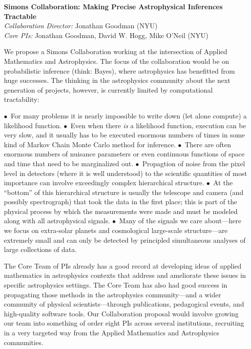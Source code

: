 \documentclass[12pt]{article}
\newcommand{\hoggitem}{$\bullet$}
\begin{document}
\sloppyy\sloppypar\thispagestyle{empty}

\noindent
\textbf{Simons Collaboration: Making Precise Astrophysical Inferences Tractable}\\
\textit{Collaboration Director:} Jonathan Goodman (NYU)\\
\textit{Core PIs:} Jonathan Goodman, David W. Hogg, Mike O'Neil (NYU)
\bigskip

We propose a Simons Collaboration working at the intersection of
Applied Mathematics and Astrophysics.
The focus of the collaboration would be on probabilistic inference
(think: Bayes), where astrophysics has benefitted from huge successes.
The thinking in the astrophysics community about the next generation of
projects, however, is currently limited by computational tractability:

\hoggitem~For many problems it is nearly impossible to write down (let
alone compute) a likelihood function.
\hoggitem~Even when there \emph{is} a likelihood function, execution
can be very slow, and it usually has to be executed enormous numbers
of times in some kind of Markov Chain Monte Carlo method for
inference.
\hoggitem~There are often enormous numbers of nuisance parameters or
even continuous functions of space and time that need to be
marginalized out.
\hoggitem~Propagtion of noise from the pixel level in detectors (where
it is well understood) to the scientific quantities of most importance
can involve exceedingly complex hierarchical structure.
\hoggitem~At the ``bottom'' of this hierarchical structure is usually
the telescope and camera (and possibly spectrograph) that took the
data in the first place; this is part of the physical process by which
the measurements were made and must be modeled along with all
astrophysical signals.
\hoggitem~Many of the signals we care about---here we focus on
extra-solar planets and cosmological large-scale structure---are
extremely small and can only be detected by principled simultaneous
analyses of large collections of data.

The Core Team of PIs already has a good record at developing ideas of
applied mathematics in astrophysics contexts that address and
ameliorate these issues in specific astrophysics settings.
The Core Team has also had good success in propagating those methods
in the astrophysics community---and a wider community of physical
scientists---through publications, pedagogical events, and
high-quality software tools.
Our Collaboration proposal would involve growing our team into
something of order eight PIs across several institutions, recruiting
in a very targeted way from the Applied Mathematics and Astrophysics
communities.
\end{document}
